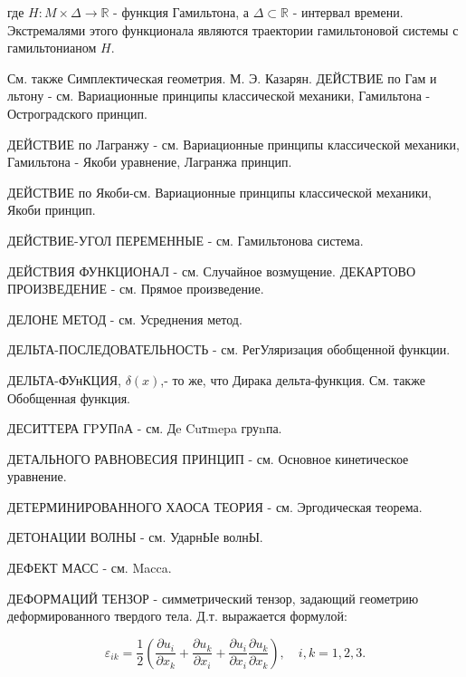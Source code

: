 \documentclass[10pt]{article}
\begin{document}
где $H: M \times \Delta \rightarrow \mathbb{R}$ - функция Гамильтона, а $\Delta \subset \mathbb{R}$ - интервал времени. Экстремалями этого функционала являются траектории гамильтоновой системы с гамильтонианом $H$.



См. также Симплектическая геометрия. М. Э. Казарян. ДЕЙСТВИЕ по Гам и льтону - см. Вариационные принципы классической механики, Гамильтона - Остроградского принцип.



ДЕЙСТВИЕ по Лагранжу - см. Вариационные принципы классической механики, Гамильтона - Якоби уравнение, Лагранжа принцип.



ДЕЙСТВИЕ по Якоби-см. Вариационные принципы классической механики, Якоби принцип.



ДЕЙСТВИЕ-УГОЛ ПЕРЕМЕННЫЕ - см. Гамильтонова система.



ДЕЙСТВИЯ ФУНКЦИОНАЛ - см. Случайное возмущение. ДЕКАРТОВО ПРОИЗВЕДЕНИЕ - см. Прямое произведение.



ДЕЛОНЕ МЕТОД - см. Усреднения метод.



ДЕЛЬТА-ПОСЛЕДОВАТЕЛЬНОСТЬ - см. РегУляризация обобщенной функции.



ДЕЛЬТА-ФУнКЦИЯ, $\delta(x)$,- то же, что Дирака дельта-функция. См. также Обобщенная функция.



ДЕСИТТЕРА ГPУПกА - см. Дe Cuтmepa груnпа.



ДЕТАЛЬНОГО РАВНОВЕСИЯ ПРИНЦИП - см. Основное кинетическое уравнение.



ДЕТЕРМИНИРОВАННОГО ХАОСА ТЕОРИЯ - см. Эргодическая теорема.



ДЕТОНАЦИИ ВОЛНЫ - см. УдарнЫе волнЫ.



ДЕФЕКТ МАСС - см. Macca.



ДЕФОРМАЦИЙ ТЕНЗОР - симметрический тензор, задающий геометрию деформированного твердого тела. Д.т. выражается формулой:



\[

\varepsilon_{i k}=\frac{1}{2}\left(\frac{\partial u_{i}}{\partial x_{k}}+\frac{\partial u_{k}}{\partial x_{i}}+\frac{\partial u_{i}}{\partial x_{i}} \frac{\partial u_{k}}{\partial x_{k}}\right), \quad i, k=1,2,3 .

\]
\end{document}
